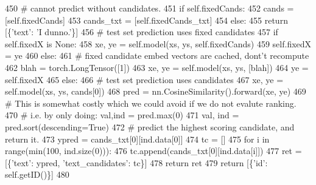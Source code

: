 \begin{DoxyCode}
450                 \textcolor{comment}{# cannot predict without candidates.}
451                 \textcolor{keywordflow}{if} self.fixedCands:
452                     cands = [self.fixedCands]
453                     cands\_txt = [self.fixedCands\_txt]
454                 \textcolor{keywordflow}{else}:
455                     \textcolor{keywordflow}{return} [\{\textcolor{stringliteral}{'text'}: \textcolor{stringliteral}{'I dunno.'}\}]
456                 \textcolor{comment}{# test set prediction uses fixed candidates}
457                 \textcolor{keywordflow}{if} self.fixedX \textcolor{keywordflow}{is} \textcolor{keywordtype}{None}:
458                     xe, ye = self.model(xs, ys, self.fixedCands)
459                     self.fixedX = ye
460                 \textcolor{keywordflow}{else}:
461                     \textcolor{comment}{# fixed candidate embed vectors are cached, dont't recompute}
462                     blah = torch.LongTensor([1])
463                     xe, ye = self.model(xs, ys, [blah])
464                     ye = self.fixedX
465             \textcolor{keywordflow}{else}:
466                 \textcolor{comment}{# test set prediction uses candidates}
467                 xe, ye = self.model(xs, ys, cands[0])
468             pred = nn.CosineSimilarity().forward(xe, ye)
469             \textcolor{comment}{# This is somewhat costly which we could avoid if we do not evalute ranking.}
470             \textcolor{comment}{# i.e. by only doing: val,ind = pred.max(0)}
471             val, ind = pred.sort(descending=\textcolor{keyword}{True})
472             \textcolor{comment}{# predict the highest scoring candidate, and return it.}
473             ypred = cands\_txt[0][ind.data[0]]
474             tc = []
475             \textcolor{keywordflow}{for} i \textcolor{keywordflow}{in} range(min(100, ind.size(0))):
476                 tc.append(cands\_txt[0][ind.data[i]])
477             ret = [\{\textcolor{stringliteral}{'text'}: ypred, \textcolor{stringliteral}{'text\_candidates'}: tc\}]
478             \textcolor{keywordflow}{return} ret
479         \textcolor{keywordflow}{return} [\{\textcolor{stringliteral}{'id'}: self.getID()\}]
480 
\end{DoxyCode}
\mbox{\label{classparlai_1_1agents_1_1starspace_1_1starspace_1_1StarspaceAgent_a4d5057250faeae3f3812603469daa282}} 
